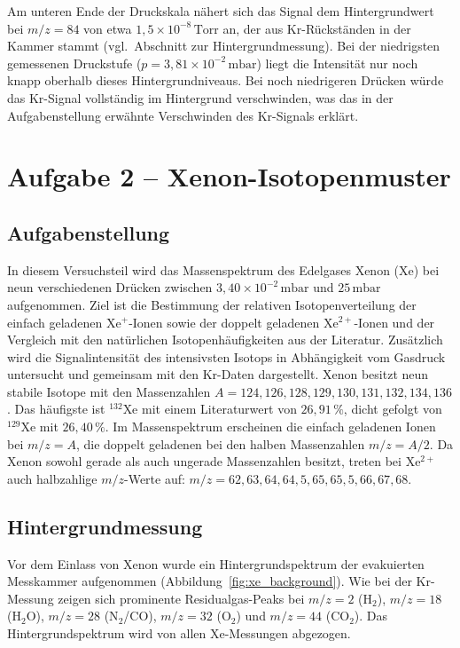 \documentclass{article}
\begin{document}
Am unteren Ende der Druckskala nähert sich das Signal dem
Hintergrundwert bei $m/z = 84$ von etwa
$1{,}5 \times 10^{-8}\,\mathrm{Torr}$ an, der aus Kr-Rückständen
in der Kammer stammt (vgl.\ Abschnitt zur Hintergrundmessung).
Bei der niedrigsten gemessenen Druckstufe
($p = 3{,}81 \times 10^{-2}\,\mathrm{mbar}$) liegt die Intensität
nur noch knapp oberhalb dieses Hintergrundniveaus.
Bei noch niedrigeren Drücken würde das Kr-Signal vollständig im
Hintergrund verschwinden, was das in der Aufgabenstellung erwähnte
Verschwinden des Kr-Signals erklärt.



\section{Aufgabe 2 -- Xenon-Isotopenmuster}

\subsection*{Aufgabenstellung}

In diesem Versuchsteil wird das Massenspektrum des Edelgases Xenon (Xe)
bei neun verschiedenen Drücken zwischen $3{,}40 \times 10^{-2}\,\mathrm{mbar}$
und $25\,\mathrm{mbar}$ aufgenommen.
Ziel ist die Bestimmung der relativen Isotopenverteilung der einfach
geladenen Xe$^+$-Ionen sowie der doppelt geladenen Xe$^{2+}$-Ionen und
der Vergleich mit den natürlichen Isotopenhäufigkeiten aus der Literatur.
Zusätzlich wird die Signalintensität des intensivsten Isotops in
Abhängigkeit vom Gasdruck untersucht und gemeinsam mit den Kr-Daten
dargestellt. Xenon besitzt neun stabile Isotope mit den Massenzahlen
$A = 124, 126, 128, 129, 130, 131, 132, 134, 136$.
Das häufigste ist $^{132}$Xe mit einem Literaturwert von $26{,}91\,\%$,
dicht gefolgt von $^{129}$Xe mit $26{,}40\,\%$.
Im Massenspektrum erscheinen die einfach geladenen Ionen bei $m/z = A$,
die doppelt geladenen bei den halben Massenzahlen $m/z = A/2$.
Da Xenon sowohl gerade als auch ungerade Massenzahlen besitzt, treten
bei Xe$^{2+}$ auch halbzahlige $m/z$-Werte auf:
$m/z = 62, 63, 64, 64{,}5, 65, 65{,}5, 66, 67, 68$.

\subsection*{Hintergrundmessung}

Vor dem Einlass von Xenon wurde ein Hintergrundspektrum der evakuierten
Messkammer aufgenommen (Abbildung~\ref{fig:xe_background}).
Wie bei der Kr-Messung zeigen sich prominente Residualgas-Peaks bei
$m/z = 2$ (H$_2$), $m/z = 18$ (H$_2$O), $m/z = 28$ (N$_2$/CO),
$m/z = 32$ (O$_2$) und $m/z = 44$ (CO$_2$).
Das Hintergrundspektrum wird von allen Xe-Messungen abgezogen.
\end{document}
